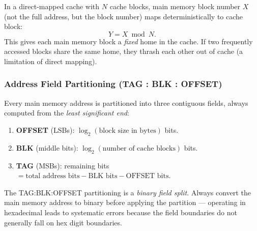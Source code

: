 \documentclass[11pt, a4paper, notitlepage]{report}
\theoremstyle{definition}
\theoremstyle{remark}
\theoremstyle{definition}
\begin{document}
In a direct-mapped cache with $N$ cache blocks, main memory block number $X$ (not the full address, but the block number) maps deterministically to cache block:
\[
  Y = X \bmod N.
\]
This gives each main memory block a \emph{fixed} home in the cache. If two frequently accessed blocks share the same home, they thrash each other out of cache (a limitation of direct mapping).

\subsubsection{Address Field Partitioning (TAG : BLK : OFFSET)}
\label{sec:tag-blk-offset}

Every main memory address is partitioned into three contiguous fields, always computed from the \emph{least significant end}:

\begin{enumerate}
  \item \textbf{OFFSET} (LSBs): $\log_2(\text{block size in bytes})$ bits.
  \item \textbf{BLK} (middle bits): $\log_2(\text{number of cache blocks})$ bits.
  \item \textbf{TAG} (MSBs): remaining bits $= \text{total address bits} - \text{BLK bits} - \text{OFFSET bits}$.
\end{enumerate}

\begin{center}
\end{center}

\begin{warning}[title={Warning: Always Work in Binary}]
  The TAG:BLK:OFFSET partitioning is a \emph{binary field split}. Always convert the main memory address to binary before applying the partition — operating in hexadecimal leads to systematic errors because the field boundaries do not generally fall on hex digit boundaries.
\end{warning}
\end{document}
